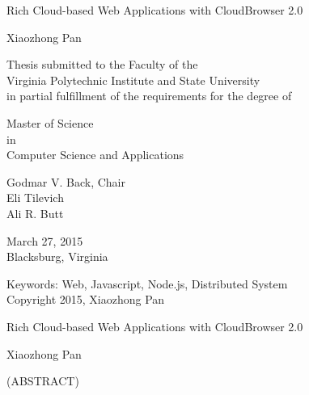 \documentclass[12pt]{report}
\begin{document}
\newcommand{\cb}{CloudBrowser\xspace}
\newcommand{\projectname}{CloudBrowser\xspace}
\newcommand{\cbtwo}{CloudBrowser 2.0\xspace}
\newcommand{\js}{JavaScript\xspace}
\newcommand{\nodejs}{Node.js\xspace}
\newcommand{\appins}{App Instance\xspace}
\newcommand{\jsdom}{JSDOM\xspace}
\newcommand{\citemain}{~\cite{mcdaniel2012cloudbrowser}}
\newcommand{\etdtitle}{Rich Cloud-based Web Applications with \cbtwo}



\def\code#1{\texttt{#1}}
\def\nodermi{\texttt{nodermi\xspace}}

\thispagestyle{empty}
\begin{center}

{\Large 
\etdtitle{}
}

\vfill

Xiaozhong Pan

\vfill

Thesis submitted to the Faculty of the \\
Virginia Polytechnic Institute and State University \\
in partial fulfillment of the requirements for the degree of

\vfill

Master of Science \\
in \\
Computer Science and Applications

\vfill

Godmar V. Back, Chair \\
Eli Tilevich\\
Ali R. Butt

\vfill

March 27, 2015 \\
Blacksburg, Virginia

\vfill

Keywords: Web, Javascript, Node.js, Distributed System
\\
Copyright 2015, Xiaozhong Pan

\end{center}

\pagebreak

\thispagestyle{empty}
\begin{center}

{\large \etdtitle{}}

\vfill

Xiaozhong Pan

\vfill

(ABSTRACT)

\vfill

\end{center}
\end{document}
